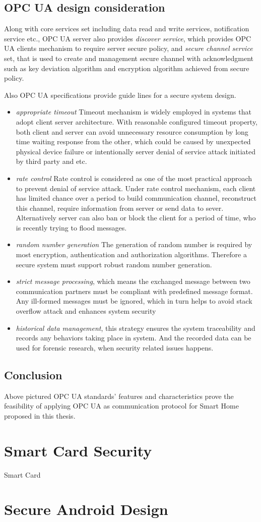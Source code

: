\subsection{OPC UA design consideration}
Along with core services set including data read and write services, notification service etc., OPC UA server also provides \emph{discover service}\cite{O4}, which provides OPC UA clients mechanism to require server secure policy, and \emph{secure channel service} set\cite{O4}, that is used to create and management secure channel with acknowledgment such as key deviation algorithm and encryption algorithm achieved from secure policy. 

Also OPC UA specifications provide guide lines for a secure system design\cite{O4}.
\begin{itemize}
\item \emph{appropriate timeout} Timeout mechanism is widely employed in systems that adopt client server architecture. With reasonable configured timeout property, both client and server can avoid unnecessary resource consumption by long time waiting response from the other, which could be caused by unexpected physical device failure or intentionally server denial of service attack initiated by third party and etc. 
\item \emph{rate control} Rate control is considered as one of the most practical approach to prevent denial of service attack. Under rate control mechanism, each client has limited chance over a period to build communication channel, reconstruct this channel, require information from server or send data to sever. Alternatively server can also ban or block the client for a period of time, who is recently trying to flood messages. 
\item \emph{random number generation} The generation of random number is required by most encryption, authentication and authorization algorithms. Therefore a secure system must support robust random number generation.
\item \emph{strict message processing}, which means the exchanged message between two communication partners must be compliant with predefined message format. Any ill-formed messages must be ignored, which in turn helps to avoid stack overflow attack and enhances system security
\item \emph{historical data management}, this strategy ensures the system traceability and records any behaviors taking place in system. And the recorded data can be used for forensic research, when security related issues happens.
\end{itemize}
\subsection{Conclusion}
Above pictured OPC UA standards' features and characteristics prove the feasibility of applying OPC UA as communication protocol for Smart Home proposed in this thesis.

\section{Smart Card Security}
Smart Card
\section{Secure Android Design}